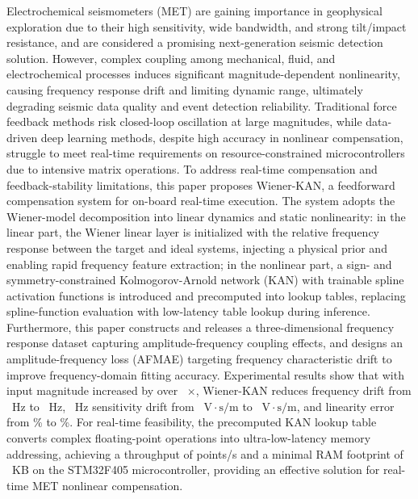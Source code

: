 \documentclass[sn-nature]{sn-jnl}
\begin{document}
{{Electrochemical seismometers (MET) are gaining importance in geophysical exploration due to their high sensitivity, wide bandwidth, and strong tilt/impact resistance, and are considered a promising next-generation seismic detection solution. However, complex coupling among mechanical, fluid, and electrochemical processes induces significant magnitude-dependent nonlinearity, causing frequency response drift and limiting dynamic range, ultimately degrading seismic data quality and event detection reliability. Traditional force feedback methods risk closed-loop oscillation at large magnitudes, while data-driven deep learning methods, despite high accuracy in nonlinear compensation, struggle to meet real-time requirements on resource-constrained microcontrollers due to intensive matrix operations. To address real-time compensation and feedback-stability limitations, this paper proposes Wiener-KAN, a feedforward compensation system for on-board real-time execution. The system adopts the Wiener-model decomposition into linear dynamics and static nonlinearity: in the linear part, the Wiener linear layer is initialized with the relative frequency response between the target and ideal systems, injecting a physical prior and enabling rapid frequency feature extraction; in the nonlinear part, a sign- and symmetry-constrained Kolmogorov-Arnold network (KAN) with trainable spline activation functions is introduced and precomputed into lookup tables, replacing spline-function evaluation with low-latency table lookup during inference. Furthermore, this paper constructs and releases a three-dimensional frequency response dataset capturing amplitude-frequency coupling effects, and designs an amplitude-frequency loss (AFMAE) targeting frequency characteristic drift to improve frequency-domain fitting accuracy. Experimental results show that with input magnitude increased by over \valInputGainExpansion~$\times$, Wiener-KAN reduces frequency drift from \valMainWienerFreqDrift~Hz to \valPrimaryFreqDrift~Hz, \valSensitivityCompareFreq~Hz sensitivity drift from \valMainWienerSensDrift~$\text{V}\cdot\text{s}/\text{m}$ to \valPrimarySensDrift~$\text{V}\cdot\text{s}/\text{m}$, and linearity error from \valMainWienerLinearity\% to \valPrimaryLinearity\%. For real-time feasibility, the precomputed KAN lookup table converts complex floating-point operations into ultra-low-latency memory addressing, achieving a throughput of \valPrimaryKeilFps{} points/s and a minimal RAM footprint of \valPrimaryKeilRamKB~KB on the STM32F405 microcontroller, providing an effective solution for real-time MET nonlinear compensation.%
}}
\end{document}
